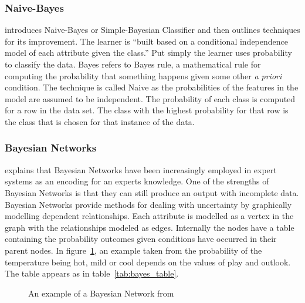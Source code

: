 \subsubsection{Naive-Bayes}
\cite{kohavi1997improving} introduces Naive-Bayes or Simple-Bayesian Classifier and then outlines techniques for its improvement. The learner is ``built based on a conditional independence model of each attribute given the class.'' Put simply the learner uses probability to classify the data. Bayes refers to Bayes rule, a mathematical rule for computing the probability that something happens given some other \textit{a priori} condition. The technique is called Naive as the probabilities of the features in the model are assumed to be independent. The probability of each class is computed for a row in the data set. The class with the highest probability for that row is the class that is chosen for that instance of the data.

\subsubsection{Bayesian Networks}

\cite{export:69588} explains that Bayesian Networks have been increasingly employed in expert systems as an encoding for an experts knowledge. One of the strengths of Bayesian Networks is that they can still produce an output with incomplete data. Bayesian Networks provide methods for dealing with uncertainty by graphically modelling dependent relationships. Each attribute is modelled as a vertex in the graph with the relationships modeled as edges. Internally the nodes have a table containing the probability outcomes given conditions have occurred in their parent nodes. In figure~\ref{fig:bayesnet}, an example taken from \cite{witten2005data} the probability of the temperature being hot, mild or cool depends on the values of play and outlook. The table appears as in table~\ref{tab:bayes_table}.

\begin{figure}[h]
\centering
{}
\caption{An example of a Bayesian Network from \cite{witten2005data}}
\label{fig:bayesnet}
\end{figure}

